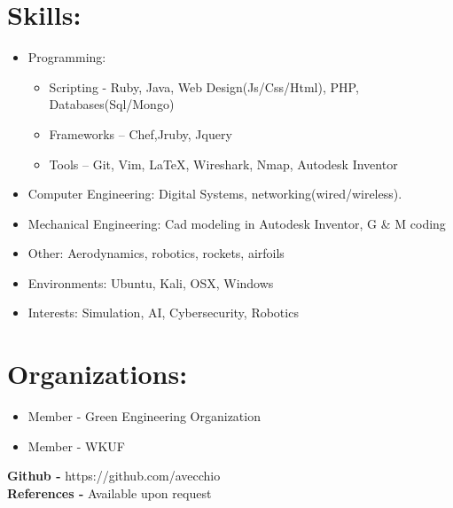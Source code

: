 \documentclass{res}
\begin{document}
\section{Skills:}
\begin{itemize}
\item Programming:
\begin{itemize}[label=$\circ$]
\item Scripting - Ruby, Java, Web Design(Js/Css/Html), PHP, Databases(Sql/Mongo)
\item  Frameworks – Chef,Jruby, Jquery
\item  Tools – Git, Vim, \LaTeX, Wireshark, Nmap, Autodesk Inventor
\end{itemize}
\item Computer Engineering: Digital Systems, networking(wired/wireless).
\item Mechanical Engineering: Cad modeling in Autodesk Inventor, G \& M coding
\item Other: Aerodynamics, robotics, rockets, airfoils
\item Environments: Ubuntu, Kali, OSX, Windows
\item Interests: Simulation, AI, Cybersecurity, Robotics
\end{itemize}
\section{Organizations:}
\begin{itemize}
\item Member - Green Engineering Organization
\item Member - WKUF
\end{itemize}


\begin{center}
\textbf{Github - }https://github.com/avecchio\\
\textbf{References -} Available upon request
\end{center}
\end{document}
